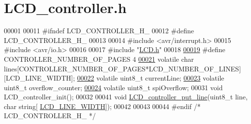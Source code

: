 \hypertarget{_l_c_d__controller_8h_source}{}\section{L\+C\+D\+\_\+controller.\+h}
\label{_l_c_d__controller_8h_source}

\begin{DoxyCode}
00001 
00011 \textcolor{preprocessor}{#ifndef LCD\_CONTROLLER\_H\_}
00012 \textcolor{preprocessor}{#define LCD\_CONTROLLER\_H\_}
00013 
00014 \textcolor{preprocessor}{#include <avr/interrupt.h>}
00015 \textcolor{preprocessor}{#include <avr/io.h>}
00016 
00017 \textcolor{preprocessor}{#include "\hyperlink{_l_c_d_8h}{LCD.h}"}
00018 
\hypertarget{_l_c_d__controller_8h_source.tex_l00019}{}\hyperlink{_l_c_d__controller_8h_aa7bbd66352e5612adc00e2b7aa77b1c9}{00019} \textcolor{preprocessor}{#define CONTROLLER\_NUMBER\_OF\_PAGES 4 }
\hypertarget{_l_c_d__controller_8h_source.tex_l00021}{}\hyperlink{_l_c_d__controller_8h_a075b70e7692af8221284f00c90d70fb2}{00021} \textcolor{preprocessor}{volatile char lines[CONTROLLER\_NUMBER\_OF\_PAGES*LCD\_NUMBER\_OF\_LINES][LCD\_LINE\_WIDTH]; }
\hypertarget{_l_c_d__controller_8h_source.tex_l00022}{}\hyperlink{_l_c_d__controller_8h_a4f799993f40fea97658f543f15842f4a}{00022} \textcolor{preprocessor}{volatile uint8\_t currentLine; }
\hypertarget{_l_c_d__controller_8h_source.tex_l00023}{}\hyperlink{_l_c_d__controller_8h_a9d160c265ce9aa4c9aa782cf7c5ecb41}{00023} \textcolor{preprocessor}{volatile uint8\_t overflow\_counter; }
\hypertarget{_l_c_d__controller_8h_source.tex_l00024}{}\hyperlink{_l_c_d__controller_8h_a5462652fe95683f50bcbd6d5fbbc3ae1}{00024} \textcolor{preprocessor}{volatile uint8\_t spiOverflow;  }
00031 \textcolor{preprocessor}{void LCD\_controller\_init();}
00032 
00041 \textcolor{keywordtype}{void} \hyperlink{_l_c_d__controller_8h_af46260996769cfaea7bb98af9ab708d1}{LCD\_controller\_put\_line}(uint8\_t line, \textcolor{keywordtype}{char} \textcolor{keywordtype}{string}[
      \hyperlink{_l_c_d_8h_a5bdd8750b215c775f2227262a1934b54}{LCD\_LINE\_WIDTH}]);
00042 
00043 
00044 \textcolor{preprocessor}{#endif }\textcolor{comment}{/* LCD\_CONTROLLER\_H\_ */}\textcolor{preprocessor}{}
\end{DoxyCode}
